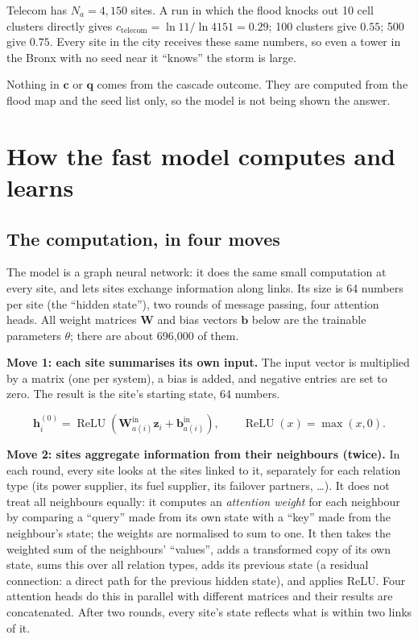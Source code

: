 \documentclass[11pt]{article}
\begin{document}
\begin{example}
Telecom has $N_a=4{,}150$ sites. A run in which the flood knocks out 10 cell clusters directly gives $c_{\text{telecom}}=\ln 11/\ln 4151=0.29$; 100 clusters give $0.55$; 500 give $0.75$. Every site in the city receives these same numbers, so even a tower in the Bronx with no seed near it ``knows'' the storm is large.
\end{example}

Nothing in $\mathbf c$ or $\mathbf q$ comes from the cascade outcome. They are computed from the flood map and the seed list only, so the model is not being shown the answer.

\section{How the fast model computes and learns}\label{sec:compute}

\subsection{The computation, in four moves}\label{sub:moves}

The model is a graph neural network: it does the same small computation at every site, and lets sites exchange information along links. Its size is 64 numbers per site (the ``hidden state''), two rounds of message passing, four attention heads. All weight matrices $\mathbf W$ and bias vectors $\mathbf b$ below are the trainable parameters $\theta$; there are about 696,000 of them.

\textbf{Move 1: each site summarises its own input.} The input vector is multiplied by a matrix (one per system), a bias is added, and negative entries are set to zero. The result is the site's starting state, 64 numbers.
\begin{maths}
\[
\mathbf h^{(0)}_i=\operatorname{ReLU}\!\left(\mathbf W^{\mathrm{in}}_{a(i)}\mathbf z_i+\mathbf b^{\mathrm{in}}_{a(i)}\right),\qquad \operatorname{ReLU}(x)=\max(x,0).
\]
\end{maths}

\textbf{Move 2: sites aggregate information from their neighbours (twice).} In each round, every site looks at the sites linked to it, separately for each relation type (its power supplier, its fuel supplier, its failover partners, \dots). It does not treat all neighbours equally: it computes an \emph{attention weight} for each neighbour by comparing a ``query'' made from its own state with a ``key'' made from the neighbour's state; the weights are normalised to sum to one. It then takes the weighted sum of the neighbours' ``values'', adds a transformed copy of its own state, sums this over all relation types, adds its previous state (a residual connection: a direct path for the previous hidden state), and applies ReLU. Four attention heads do this in parallel with different matrices and their results are concatenated. After two rounds, every site's state reflects what is within two links of it.
\end{document}
